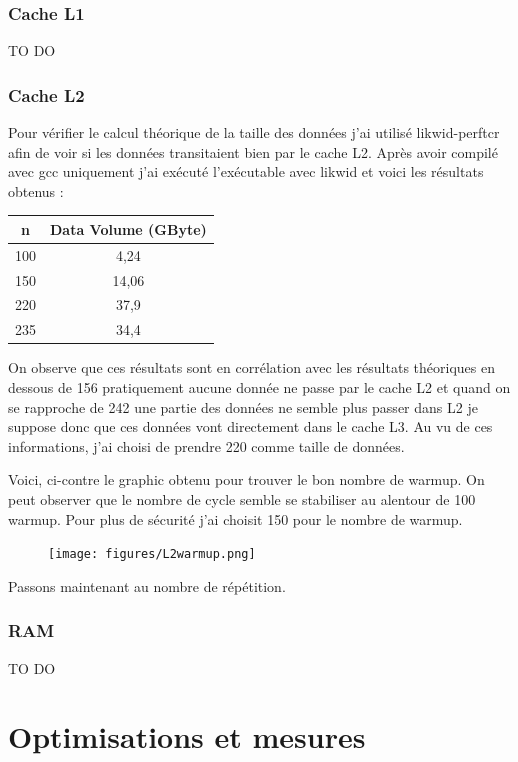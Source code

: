 \documentclass[12pt,a4paper]{article}
\begin{document}
\subsubsection{Cache L1}
TO DO

\subsubsection{Cache L2}
Pour vérifier le calcul théorique de la taille des données j'ai utilisé 
likwid-perftcr afin de voir si les données transitaient bien par le cache L2. 
Après avoir compilé avec gcc uniquement j'ai exécuté l'exécutable avec likwid 
et voici les résultats obtenus :
\newline

\begin{tabular}{|c|c|}
  \hline
  n & Data Volume (GByte) \\
  \hline
  100 & 4,24 \\
  150 & 14,06 \\
  220 & 37,9 \\
  235 & 34,4 \\
  \hline
\end{tabular}

On observe que ces résultats sont en corrélation avec les résultats théoriques
en dessous de 156 pratiquement aucune donnée ne passe par le cache L2 et 
quand on se rapproche de 242 une partie des données ne semble plus passer 
dans L2 je suppose donc que ces données vont directement dans le cache L3.
Au vu de ces informations, j'ai choisi de prendre 220 comme taille de 
données.

\newline
Voici, ci-contre le graphic obtenu pour trouver le bon nombre de warmup. 
On peut observer que le nombre de cycle semble se stabiliser au alentour 
de 100 warmup. Pour plus de sécurité j'ai choisit 150 pour le nombre de 
warmup.

\begin{figure}
    \texttt{[image: figures/L2warmup.png]}
\end{figure}
\newline
Passons maintenant au nombre de répétition. 

\subsubsection{RAM}
TO DO


\section{Optimisations et mesures}
\end{document}
